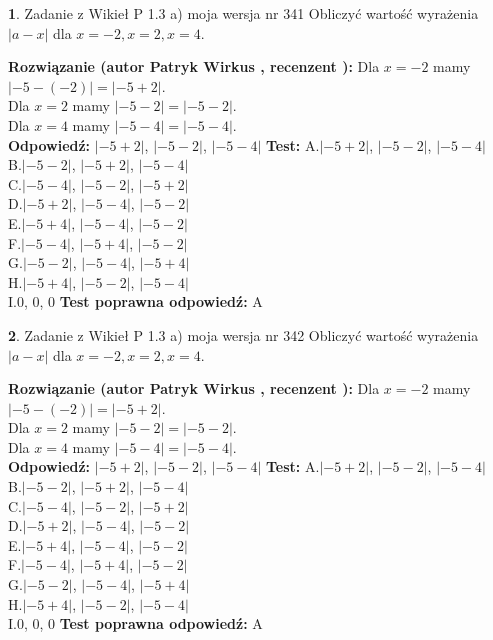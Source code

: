 \documentclass[12pt, a4paper]{article}
\theoremstyle{definition} %
\newtheorem{zad}{}
\newcommand{\zadStart}[1]{\begin{zad}#1\newline}
\newcommand{\zadStop}{\end{zad}}
\newcommand{\rozwStart}[2]{\noindent \textbf{Rozwiązanie (autor #1 , recenzent #2): }\newline}
\newcommand{\rozwStop}{\newline}
\newcommand{\odpStart}{\noindent \textbf{Odpowiedź:}\newline}
\newcommand{\odpStop}{\newline}
\newcommand{\testStart}{\noindent \textbf{Test:}\newline}
\newcommand{\testStop}{\newline}
\newcommand{\kluczStart}{\noindent \textbf{Test poprawna odpowiedź:}\newline}
\newcommand{\kluczStop}{\newline}
\begin{document}
\zadStart{Zadanie z Wikieł P 1.3 a) moja wersja nr 341}
Obliczyć wartość wyrażenia $|a - x|$ dla $x=-2,x=2,x=4$.
\zadStop
\rozwStart{Patryk Wirkus}{}
Dla $x = -2$ mamy $|-5 - (-2)| = |-5 + 2|$.\\
Dla $x = 2$ mamy $|-5 - 2| = |-5 - 2|$.\\
Dla $x = 4$ mamy $|-5 - 4| = |-5 - 4|$.\\
\rozwStop
\odpStart
$|-5 + 2|$, $|-5 - 2|$, $|-5 - 4|$
\odpStop
\testStart
A.$|-5 + 2|$, $|-5 - 2|$, $|-5 - 4|$\\
B.$|-5 - 2|$, $|-5 + 2|$, $|-5 - 4|$\\
C.$|-5 - 4|$, $|-5 - 2|$, $|-5 + 2|$\\
D.$|-5 + 2|$, $|-5 - 4|$, $|-5 - 2|$\\
E.$|-5 + 4|$, $|-5 - 4|$, $|-5 - 2|$\\
F.$|-5 - 4|$, $|-5 + 4|$, $|-5 - 2|$\\
G.$|-5 - 2|$, $|-5 - 4|$, $|-5 + 4|$\\
H.$|-5 + 4|$, $|-5 - 2|$, $|-5 - 4|$\\
I.$0$, $0$, $0$
\testStop
\kluczStart
A
\kluczStop



\zadStart{Zadanie z Wikieł P 1.3 a) moja wersja nr 342}
Obliczyć wartość wyrażenia $|a - x|$ dla $x=-2,x=2,x=4$.
\zadStop
\rozwStart{Patryk Wirkus}{}
Dla $x = -2$ mamy $|-5 - (-2)| = |-5 + 2|$.\\
Dla $x = 2$ mamy $|-5 - 2| = |-5 - 2|$.\\
Dla $x = 4$ mamy $|-5 - 4| = |-5 - 4|$.\\
\rozwStop
\odpStart
$|-5 + 2|$, $|-5 - 2|$, $|-5 - 4|$
\odpStop
\testStart
A.$|-5 + 2|$, $|-5 - 2|$, $|-5 - 4|$\\
B.$|-5 - 2|$, $|-5 + 2|$, $|-5 - 4|$\\
C.$|-5 - 4|$, $|-5 - 2|$, $|-5 + 2|$\\
D.$|-5 + 2|$, $|-5 - 4|$, $|-5 - 2|$\\
E.$|-5 + 4|$, $|-5 - 4|$, $|-5 - 2|$\\
F.$|-5 - 4|$, $|-5 + 4|$, $|-5 - 2|$\\
G.$|-5 - 2|$, $|-5 - 4|$, $|-5 + 4|$\\
H.$|-5 + 4|$, $|-5 - 2|$, $|-5 - 4|$\\
I.$0$, $0$, $0$
\testStop
\kluczStart
A
\kluczStop
\end{document}
